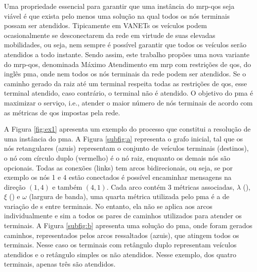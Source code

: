 Uma propriedade essencial para garantir  que uma instância do \gls{mrp-qos} seja
viável é que exista pelo menos uma solução na qual todos os nós terminais possam
ser  atendidos.  Tipicamente  em  VANETs os  veículos  podem  ocasionalmente  se
desconectarem da  rede em  virtude de  suas elevadas  mobilidades, ou  seja, nem
sempre  é  possível garantir  que  todos  os  veículos  serão atendidos  a  todo
instante. Sendo assim, este trabalho propões uma nova variante do \gls{mrp-qos},
denominada  Máximo Atendimento  em  \gls{mrp} com  restrições  de \gls{qos},  do
inglês \gls{pma}, onde  nem todos os nós terminais da  rede podem ser atendidos.
Se o  caminho gerado  da raiz até  um terminal respeita  todas as  restrições de
\gls{qos}, esse terminal atendido, caso contrário,  o terminal não é atendido. O
objetivo do \gls{pma} é maximizar o serviço, i.e., atender o maior número de nós
terminais de acordo com as métricas de \gls{qos} impostas pela rede.

A Figura \ref{fig:ex1} apresenta um  exemplo do processo que constitui
a resolução  de uma  instância do  \gls{pma}. A  Figura \ref{subfig:a}
representa  o  grafo inicial,  tal  que  os nós  retangulares  (azuis)
representam  o conjunto  de veículos  terminais (destinos),  o nó  com
círculo  duplo (vermelho)  é o  nó raiz,  enquanto os  demais nós  são
opcionais.   Todas as  conexões  (links) tem  arcos bidirecionais,  ou
seja,  se  por exemplo  os  nós  1 e  4  estão  conectados é  possível
encaminhar mensagens na direção $(1, 4)$ e também $(4, 1)$.  Cada arco
contém 3 métricas associadas,  $\lambda$ ({\delay}), $\xi$ ({\jitter})
e  $\omega$ (largura  de  banda), uma  quarta  métrica utilizada  pelo
\gls{pma} é a de variação de  {\delay s} entre terminais.  No entanto,
ela não se aplica aos arcos individualmente  e sim a todos os pares de
caminhos   utilizados   para   atender   os   terminais.    A   Figura
\ref{subfig:b} apresenta uma solução  do \gls{pma}, onde foram gerados
caminhos, representados  pelos arcos ressaltados (azuis),  que atingem
todos  os  terminais. Nesse  caso  os  terminais com  retângulo  duplo
representam  veículos   atendidos  e   o  retângulo  simples   os  não
atendidos.  Nesse  exemplo,  dos  quatro terminais,  apenas  três  são
atendidos.

